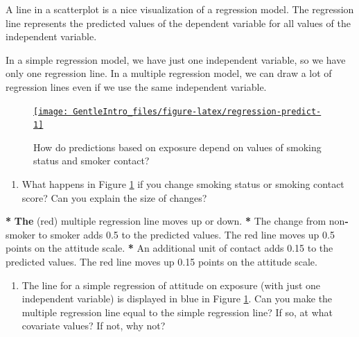 \documentclass[a4paper]{book}
\newenvironment{Shaded}{\begin{snugshade}}{\end{snugshade}}
\newcommand{\KeywordTok}[1]{\textcolor[rgb]{0,0,0}{\textbf{#1}}}
\newcommand{\FloatTok}[1]{\textcolor[rgb]{0.00,0.00,0.00}{#1}}
\newcommand{\StringTok}[1]{\textcolor[rgb]{0.00,0.00,0.00}{#1}}
\newcommand{\OperatorTok}[1]{\textcolor[rgb]{0.00,0.00,0.00}{\textbf{#1}}}
\newcommand{\NormalTok}[1]{#1}
\providecommand{\tightlist}{%
  \setlength{\itemsep}{0pt}\setlength{\parskip}{0pt}}
\theoremstyle{definition}
\theoremstyle{definition}
\theoremstyle{definition}
\theoremstyle{remark}
\begin{document}
A line in a scatterplot is a nice visualization of a regression model.
The regression line represents the predicted values of the dependent
variable for all values of the independent variable.

In a simple regression model, we have just one independent variable, so
we have only one regression line. In a multiple regression model, we can
draw a lot of regression lines even if we use the same independent
variable.

\begin{figure}[H]
\href{http://82.196.4.233:3838/apps/regression-predict/}{\texttt{[image: GentleIntro\_files/figure-latex/regression-predict-1]} }\caption{How do predictions based on exposure depend on values of smoking status and smoker contact?}\label{fig:regression-predict}
\end{figure}

\begin{enumerate}
\def\labelenumi{\arabic{enumi}.}
\tightlist
\item
  What happens in Figure \ref{fig:regression-predict} if you change
  smoking status or smoking contact score? Can you explain the size of
  changes?
\end{enumerate}

\begin{Shaded}
\begin{Highlighting}[]
\OperatorTok{*}\StringTok{ }\KeywordTok{The}\NormalTok{ (red) multiple regression line moves up or down.}
\OperatorTok{*}\StringTok{ }\NormalTok{The change from non}\OperatorTok{-}\NormalTok{smoker to smoker adds }\FloatTok{0.5}\NormalTok{ to the predicted values. The}
\NormalTok{red line moves up }\FloatTok{0.5}\NormalTok{ points on the attitude scale.}
\OperatorTok{*}\StringTok{ }\NormalTok{An additional unit of contact adds }\FloatTok{0.15}\NormalTok{ to the predicted values. The red line}
\NormalTok{moves up }\FloatTok{0.15}\NormalTok{ points on the attitude scale.}
\end{Highlighting}
\end{Shaded}

\begin{enumerate}
\def\labelenumi{\arabic{enumi}.}
\setcounter{enumi}{1}
\tightlist
\item
  The line for a simple regression of attitude on exposure (with just
  one independent variable) is displayed in blue in Figure
  \ref{fig:regression-predict}. Can you make the multiple regression
  line equal to the simple regression line? If so, at what covariate
  values? If not, why not?
\end{enumerate}
\end{document}
